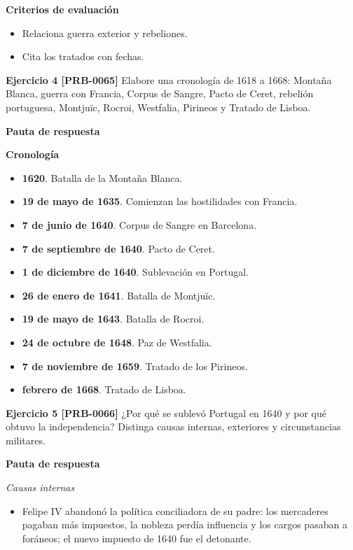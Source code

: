 \documentclass{book}
\begin{document}
\noindent\textbf{Criterios de evaluación}
\begin{itemize}
\item Relaciona guerra exterior y rebeliones.
\item Cita los tratados con fechas.
\end{itemize}

\noindent\textbf{Ejercicio 4 [PRB-0065]}
Elabore una cronología de 1618 a 1668: Montaña Blanca, guerra con Francia, Corpus de Sangre, Pacto de Ceret, rebelión portuguesa, Montjuïc, Rocroi, Westfalia, Pirineos y Tratado de Lisboa.


\noindent\textbf{Pauta de respuesta}

\noindent\textbf{Cronología}
\begin{itemize}
\item \textbf{1620}. Batalla de la Montaña Blanca.
\item \textbf{19 de mayo de 1635}. Comienzan las hostilidades con Francia.
\item \textbf{7 de junio de 1640}. Corpus de Sangre en Barcelona.
\item \textbf{7 de septiembre de 1640}. Pacto de Ceret.
\item \textbf{1 de diciembre de 1640}. Sublevación en Portugal.
\item \textbf{26 de enero de 1641}. Batalla de Montjuïc.
\item \textbf{19 de mayo de 1643}. Batalla de Rocroi.
\item \textbf{24 de octubre de 1648}. Paz de Westfalia.
\item \textbf{7 de noviembre de 1659}. Tratado de los Pirineos.
\item \textbf{febrero de 1668}. Tratado de Lisboa.
\end{itemize}

\noindent\textbf{Ejercicio 5 [PRB-0066]}
¿Por qué se sublevó Portugal en 1640 y por qué obtuvo la independencia? Distinga causas internas, exteriores y circunstancias militares.


\noindent\textbf{Pauta de respuesta}

\noindent\textit{Causas internas}
\begin{itemize}
\item Felipe IV abandonó la política conciliadora de su padre: los mercaderes pagaban más impuestos, la nobleza perdía influencia y los cargos pasaban a foráneos; el nuevo impuesto de 1640 fue el detonante.
\end{itemize}
\end{document}
